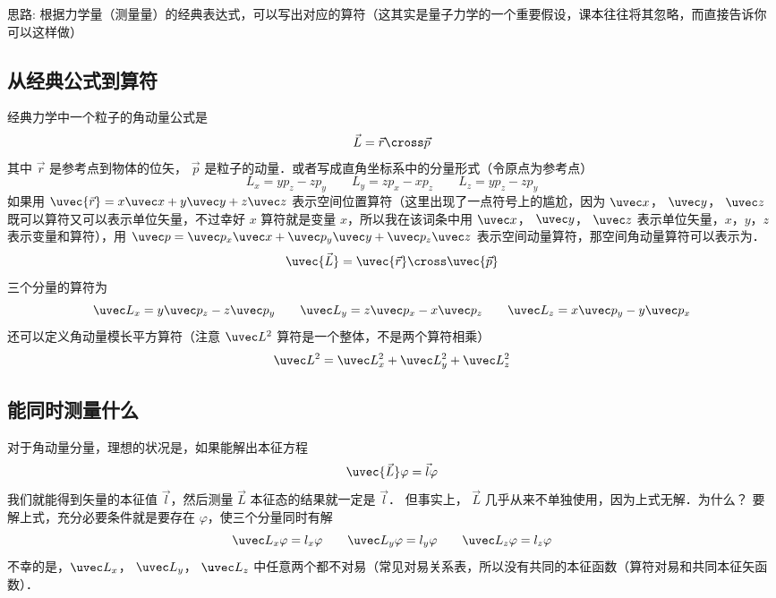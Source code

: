 

思路: 根据力学量（测量量）的经典表达式，可以写出对应的算符（这其实是量子力学的一个重要假设，课本往往将其忽略，而直接告诉你可以这样做）

\subsection{从经典公式到算符}

经典力学中一个粒子的角动量公式是
\begin{equation}
\vec L = \vec r \cross \vec p
\end{equation}
其中 $\vec r$ 是参考点到物体的位矢， $\vec p$ 是粒子的动量．或者写成直角坐标系中的分量形式（令原点为参考点）
\begin{equation}
{L_x} = y{p_z} - z{p_y} \qquad
{L_y} = z{p_x} - x{p_z} \qquad
{L_z} = y{p_z} - z{p_y}
\end{equation}   
如果用 $ \uvec {\vec r} = x\uvec x + y\uvec y + z\uvec z$ 表示空间位置算符（这里出现了一点符号上的尴尬，因为 $ \uvec x$， $ \uvec y$，  $ \uvec z$ 既可以算符又可以表示单位矢量，不过幸好 $x$ 算符就是变量 $x$，所以我在该词条中用 $ \uvec x$， $ \uvec y$，  $ \uvec z$ 表示单位矢量，$x$，$y$，$z$ 表示变量和算符），用 $\uvec p = {\uvec p_x}\uvec x + {\uvec p_y}\uvec y + {\uvec p_z}\uvec z$ 表示空间动量算符，那空间角动量算符可以表示为．
\begin{equation}
\uvec {\vec L} = \uvec {\vec r} \cross \uvec {\vec p}
\end{equation}
三个分量的算符为
\begin{equation}
{\uvec L_x} = y{\uvec p_z} - z{\uvec p_y} \qquad
{\uvec L_y} = z{\uvec p_x} - x{\uvec p_z} \qquad
{\uvec L_z} = x{\uvec p_y} - y{\uvec p_x}
\end{equation}   
还可以定义角动量模长平方算符（注意 ${\uvec L^2}$ 算符是一个整体，不是两个算符相乘）
\begin{equation}
{\uvec L^2} = \uvec L_x^2 + \uvec L_y^2 + \uvec L_z^2
\end{equation}

\subsection{能同时测量什么}

对于角动量分量，理想的状况是，如果能解出本征方程
\begin{equation}
\uvec {\vec L}\varphi  = \vec l\varphi 
\end{equation}
我们就能得到矢量的本征值 $\vec l$，然后测量 $\vec L$ 本征态的结果就一定是 $\vec l$． 但事实上， $\vec L$ 几乎从来不单独使用，因为上式无解．为什么？ 要解上式，充分必要条件就是要存在 $\varphi $，使三个分量同时有解
\begin{equation}
{\uvec L_x}\varphi  = {l_x}\varphi \qquad
{\uvec L_y}\varphi  = {l_y}\varphi \qquad
{\uvec L_z}\varphi  = {l_z}\varphi 
\end{equation}   
不幸的是，${\uvec L_x}$， ${\uvec L_y}$， ${\uvec L_z}$ 中任意两个都不对易（常见对易关系表，所以没有共同的本征函数（算符对易和共同本征矢函数）．%

